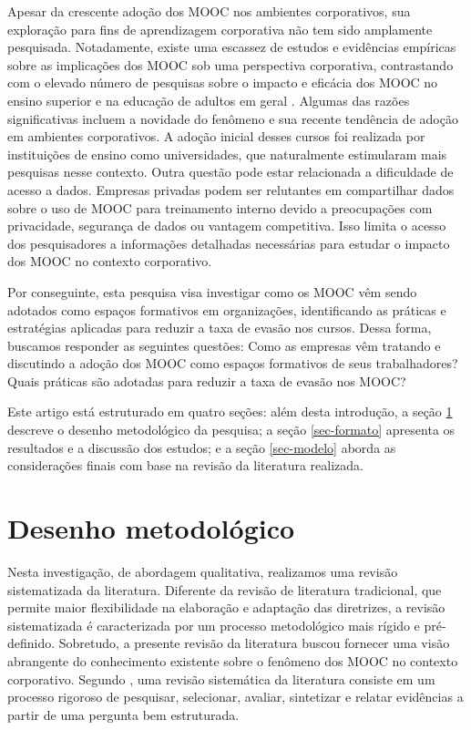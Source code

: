 \documentclass[portuguese]{textolivre}
\begin{document}
Apesar da crescente adoção dos MOOC nos ambientes corporativos, sua exploração para fins de aprendizagem corporativa não tem sido amplamente pesquisada. Notadamente, existe uma escassez de estudos e evidências empíricas sobre as implicações dos MOOC sob uma perspectiva corporativa, contrastando com o elevado número de pesquisas sobre o impacto e eficácia dos MOOC no ensino superior e na educação de adultos em geral \cite{zur_transforming_2021,yan_construction_2022,park_moocs_2021}. Algumas das razões significativas incluem a novidade do fenômeno e sua recente tendência de adoção em ambientes corporativos. A adoção inicial desses cursos foi realizada por instituições de ensino como universidades, que naturalmente estimularam mais pesquisas nesse contexto. Outra questão pode estar relacionada a dificuldade de acesso a dados.  Empresas privadas podem ser relutantes em compartilhar dados sobre o uso de MOOC para treinamento interno devido a preocupações com privacidade, segurança de dados ou vantagem competitiva. Isso limita o acesso dos pesquisadores a informações detalhadas necessárias para estudar o impacto dos MOOC no contexto corporativo.

Por conseguinte, esta pesquisa visa investigar como os MOOC vêm sendo adotados como espaços formativos em organizações, identificando as práticas e estratégias aplicadas para reduzir a taxa de evasão nos cursos. Dessa forma, buscamos responder as seguintes questões: Como as empresas vêm tratando e discutindo a adoção dos MOOC como espaços formativos de seus trabalhadores? Quais práticas são adotadas para reduzir a taxa de evasão nos MOOC?

Este artigo está estruturado em quatro seções: além desta introdução, a seção \ref{sec-normas} descreve o desenho metodológico da pesquisa; a seção \ref{sec-formato} apresenta os resultados e a discussão dos estudos; e a seção \ref{sec-modelo} aborda as considerações finais com base na revisão da literatura realizada.

\section{Desenho metodológico}\label{sec-normas}
Nesta investigação, de abordagem qualitativa, realizamos uma revisão sistematizada da literatura. Diferente da revisão de literatura tradicional, que permite maior flexibilidade na elaboração e adaptação das diretrizes, a revisão sistematizada é caracterizada por um processo metodológico mais rígido e pré-definido.  Sobretudo, a presente revisão da literatura buscou fornecer uma visão abrangente do conhecimento existente sobre o fenômeno dos MOOC no contexto corporativo. Segundo \textcite{galvao_principais_2015}, uma revisão sistemática da literatura consiste em um processo rigoroso de pesquisar, selecionar, avaliar, sintetizar e relatar evidências a partir de uma pergunta bem estruturada. 
\end{document}
